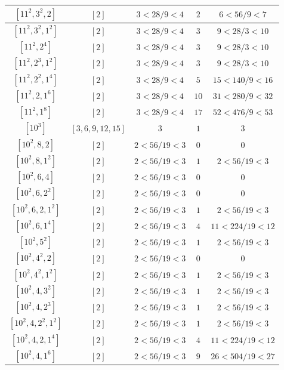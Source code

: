 \documentclass{article}%
\begin{document}
\begin{center}
\begin{longtable}{||c|c|c|c|c||}
$[11^{2}, 3^{2}, 2]$ & $[2]$ & $3 < 28/9 < 4$ & $2$ & $6 < 56/9 < 7$ \\ \hline 
$[11^{2}, 3^{2}, 1^{2}]$ & $[2]$ & $3 < 28/9 < 4$ & $3$ & $9 < 28/3 < 10$ \\ \hline 
$[11^{2}, 2^{4}]$ & $[2]$ & $3 < 28/9 < 4$ & $3$ & $9 < 28/3 < 10$ \\ \hline 
$[11^{2}, 2^{3}, 1^{2}]$ & $[2]$ & $3 < 28/9 < 4$ & $3$ & $9 < 28/3 < 10$ \\ \hline 
$[11^{2}, 2^{2}, 1^{4}]$ & $[2]$ & $3 < 28/9 < 4$ & $5$ & $15 < 140/9 < 16$ \\ \hline 
$[11^{2}, 2, 1^{6}]$ & $[2]$ & $3 < 28/9 < 4$ & $10$ & $31 < 280/9 < 32$ \\ \hline 
$[11^{2}, 1^{8}]$ & $[2]$ & $3 < 28/9 < 4$ & $17$ & $52 < 476/9 < 53$ \\ \hline 
$[10^{3}]$ & $[3, 6, 9, 12, 15]$ & $3$ & $1$ & $3$ \\ \hline 
$[10^{2}, 8, 2]$ & $[2]$ & $2 < 56/19 < 3$ & $0$ & $0$ \\ \hline 
$[10^{2}, 8, 1^{2}]$ & $[2]$ & $2 < 56/19 < 3$ & $1$ & $2 < 56/19 < 3$ \\ \hline 
$[10^{2}, 6, 4]$ & $[2]$ & $2 < 56/19 < 3$ & $0$ & $0$ \\ \hline 
$[10^{2}, 6, 2^{2}]$ & $[2]$ & $2 < 56/19 < 3$ & $0$ & $0$ \\ \hline 
$[10^{2}, 6, 2, 1^{2}]$ & $[2]$ & $2 < 56/19 < 3$ & $1$ & $2 < 56/19 < 3$ \\ \hline 
$[10^{2}, 6, 1^{4}]$ & $[2]$ & $2 < 56/19 < 3$ & $4$ & $11 < 224/19 < 12$ \\ \hline 
$[10^{2}, 5^{2}]$ & $[2]$ & $2 < 56/19 < 3$ & $1$ & $2 < 56/19 < 3$ \\ \hline 
$[10^{2}, 4^{2}, 2]$ & $[2]$ & $2 < 56/19 < 3$ & $0$ & $0$ \\ \hline 
$[10^{2}, 4^{2}, 1^{2}]$ & $[2]$ & $2 < 56/19 < 3$ & $1$ & $2 < 56/19 < 3$ \\ \hline 
$[10^{2}, 4, 3^{2}]$ & $[2]$ & $2 < 56/19 < 3$ & $1$ & $2 < 56/19 < 3$ \\ \hline 
$[10^{2}, 4, 2^{3}]$ & $[2]$ & $2 < 56/19 < 3$ & $1$ & $2 < 56/19 < 3$ \\ \hline 
$[10^{2}, 4, 2^{2}, 1^{2}]$ & $[2]$ & $2 < 56/19 < 3$ & $1$ & $2 < 56/19 < 3$ \\ \hline 
$[10^{2}, 4, 2, 1^{4}]$ & $[2]$ & $2 < 56/19 < 3$ & $4$ & $11 < 224/19 < 12$ \\ \hline 
$[10^{2}, 4, 1^{6}]$ & $[2]$ & $2 < 56/19 < 3$ & $9$ & $26 < 504/19 < 27$ \\ \hline 

\end{longtable}
\end{center}
\end{document}
